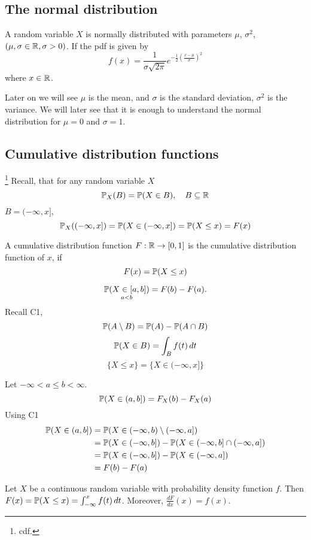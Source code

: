 \documentclass[10pt, a4paper]{article}
\begin{document}
\subsection{The normal distribution}
\begin{definition}
    A random variable $X$ is normally distributed with parameters $\mu$,
    $\sigma ^ 2$, $(\mu, \sigma \in \R, \sigma > 0)$.
    If the pdf is given by
    \[
    f(x) = \frac{1}{\sigma\sqrt{2\pi}}e ^ {-\frac{1}{2}(\frac{x - \mu}{\sigma}) ^ 2}
    \]
    where $x \in \R$.
\end{definition}
Later on we will see $\mu$ is the mean,
and $\sigma$ is the standard deviation,
$\sigma ^ 2$ is the variance.
We will later see that it is enough to understand the normal distribution for $\mu = 0$ and $\sigma = 1$.

\subsection{Cumulative distribution functions}\footnote{cdf.}
Recall,
that for any random variable $X$
\[
\P_X(B) = \P(X \in B),\quad B \subseteq \R
\]
$B = (-\infty, x]$,
\[
\P_X((-\infty, x]) = \P(X \in (-\infty, x]) = \P(X \leq x) = F(x)
\]
\begin{definition}
    A cumulative distribution function $F : \R \rightarrow [0, 1]$ is the cumulative distribution function of $x$,
    if
    \[
    F(x) = \P(X \leq x)
    \]
\end{definition}

\[
\underset{a < b}{\P(X \in [a, b])} = F(b) - F(a).
\]
Recall C1,
\[
\P(A \setminus B) = \P(A) - \P(A \cap B)
\]
\[
\P(X \in B) = \int_Bf(t)\,dt
\]
\[
\{X \leq x\} = \{X \in (-\infty, x]\}
\]

Let $-\infty < a \leq b < \infty$.
\[
\P(X \in (a, b]) = F_X(b) - F_X(a)
\]
Using C1
\begin{align*}
    \P(X \in (a, b]) &= \P(X \in (-\infty, b) \setminus (-\infty, a]) \\
    &= \P(X \in (-\infty, b]) - \P(X \in (-\infty, b] \cap (-\infty, a]) \\
    &= \P(X \in (-\infty, b]) - \P(X \in (-\infty, a]) \\
    &= F(b) - F(a)
\end{align*}

\begin{theorem}
    Let $X$ be a continuous random variable with probability density function $f$.
    Then $F(x) = \P(X \leq x) = \int_{-\infty}^xf(t)\,dt$.
    Moreover,
    $\frac{dF}{dx}(x) = f(x)$.
\end{theorem}
\end{document}
